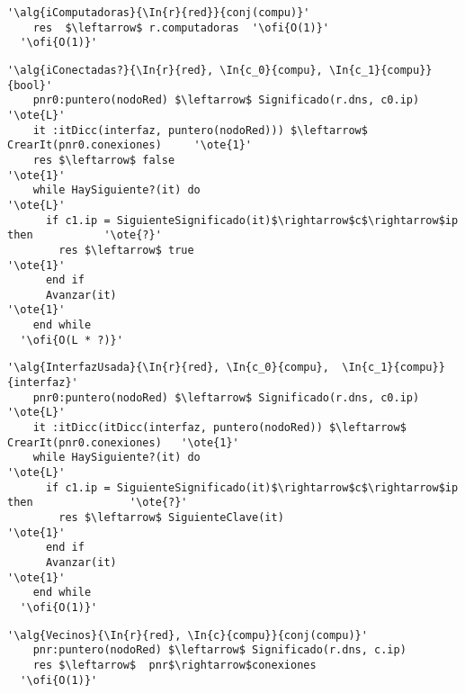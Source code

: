 \begin{lstlisting}[mathescape]
  '\alg{iComputadoras}{\In{r}{red}}{conj(compu)}'
    res  $\leftarrow$ r.computadoras  '\ofi{O(1)}'
  '\ofi{O(1)}'
\end{lstlisting}

\begin{lstlisting}[mathescape]
  '\alg{iConectadas?}{\In{r}{red}, \In{c_0}{compu}, \In{c_1}{compu}}{bool}'
    pnr0:puntero(nodoRed) $\leftarrow$ Significado(r.dns, c0.ip)                      '\ote{L}' 
    it :itDicc(interfaz, puntero(nodoRed))) $\leftarrow$ CrearIt(pnr0.conexiones)     '\ote{1}' 
    res $\leftarrow$ false                                                            '\ote{1}'
    while HaySiguiente?(it) do                                                        '\ote{L}'
      if c1.ip = SiguienteSignificado(it)$\rightarrow$c$\rightarrow$ip then           '\ote{?}'
        res $\leftarrow$ true                                                         '\ote{1}'
      end if
      Avanzar(it)                                                                     '\ote{1}'
    end while
  '\ofi{O(L * ?)}'
\end{lstlisting}

\begin{lstlisting}[mathescape]
  '\alg{InterfazUsada}{\In{r}{red}, \In{c_0}{compu},  \In{c_1}{compu}}{interfaz}'
    pnr0:puntero(nodoRed) $\leftarrow$ Significado(r.dns, c0.ip)                          '\ote{L}' 
    it :itDicc(itDicc(interfaz, puntero(nodoRed)) $\leftarrow$ CrearIt(pnr0.conexiones)   '\ote{1}' 
    while HaySiguiente?(it) do                                                            '\ote{L}'
      if c1.ip = SiguienteSignificado(it)$\rightarrow$c$\rightarrow$ip then               '\ote{?}'
        res $\leftarrow$ SiguienteClave(it)                                               '\ote{1}'
      end if
      Avanzar(it)                                                                         '\ote{1}'
    end while
  '\ofi{O(1)}'
\end{lstlisting}


\begin{lstlisting}[mathescape]
  '\alg{Vecinos}{\In{r}{red}, \In{c}{compu}}{conj(compu)}'
    pnr:puntero(nodoRed) $\leftarrow$ Significado(r.dns, c.ip)     
    res $\leftarrow$  pnr$\rightarrow$conexiones                 
  '\ofi{O(1)}'
\end{lstlisting}